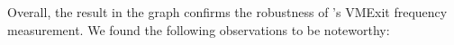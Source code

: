 















Overall, the result in the graph confirms the robustness of \thename's VMExit frequency measurement.
We found the following observations to be noteworthy:

